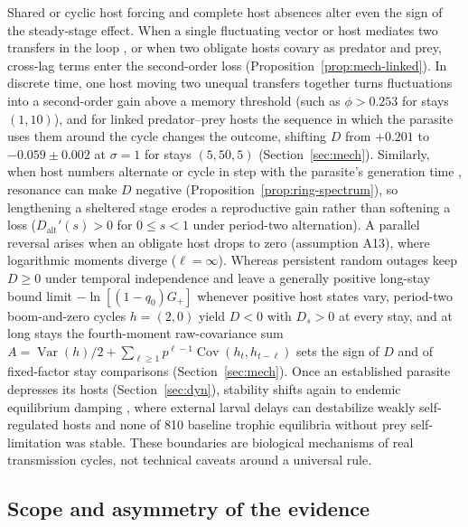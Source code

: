 Shared or cyclic host forcing and complete host absences alter even the sign of the steady-stage effect. When a single fluctuating vector or host mediates two transfers in the loop \citep{watts2021}, or when two obligate hosts covary as predator and prey, cross-lag terms enter the second-order loss (Proposition~\ref{prop:mech-linked}). In discrete time, one host moving two unequal transfers together turns fluctuations into a second-order gain above a memory threshold (such as $\phi > 0.253$ for stays $(1, 10)$), and for linked predator--prey hosts the sequence in which the parasite uses them around the cycle changes the outcome, shifting $D$ from $+0.201$ to $-0.059 \pm 0.002$ at $\sigma = 1$ for stays $(5, 50, 5)$ (Section~\ref{sec:mech}). Similarly, when host numbers alternate or cycle in step with the parasite's generation time \citep{tuljapurkar1985,botsford2014}, resonance can make $D$ negative (Proposition~\ref{prop:ring-spectrum}), so lengthening a sheltered stage erodes a reproductive gain rather than softening a loss ($D_{\mathrm{alt}}'(s) > 0$ for $0 \le s < 1$ under period-two alternation). A parallel reversal arises when an obligate host drops to zero (assumption A13), where logarithmic moments diverge ($\ell = \infty$). Whereas persistent random outages keep $D \ge 0$ under temporal independence and leave a generally positive long-stay bound limit $-\ln[(1 - q_0)G_+]$ whenever positive host states vary, period-two boom-and-zero cycles $h = (2, 0)$ yield $D < 0$ with $D_s > 0$ at every stay, and at long stays the fourth-moment raw-covariance sum $A = \operatorname{Var}(h)/2 + \sum_{\ell \ge 1} p^{\ell - 1}\operatorname{Cov}(h_t, h_{t-\ell})$ sets the sign of $D$ and of fixed-factor stay comparisons (Section~\ref{sec:mech}). Once an established parasite depresses its hosts (Section~\ref{sec:dyn}), stability shifts again to endemic equilibrium damping \citep{anderson1978,dobson1992}, where external larval delays can destabilize weakly self-regulated hosts and none of 810 baseline trophic equilibria without prey self-limitation was stable. These boundaries are biological mechanisms of real transmission cycles, not technical caveats around a universal rule.

\subsection{Scope and asymmetry of the evidence}\label{subsec:disc-evidence}

